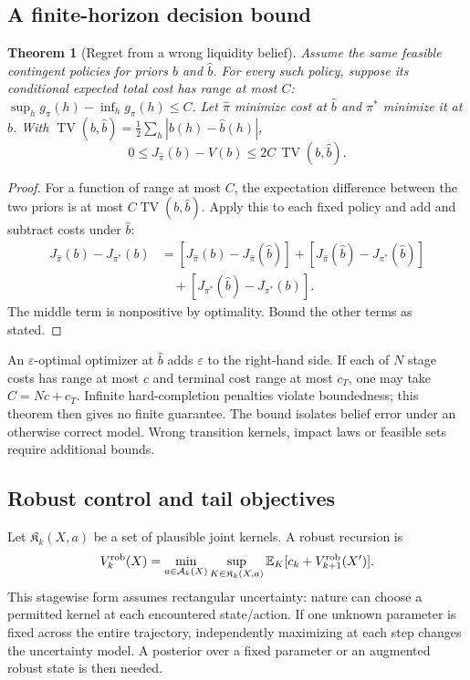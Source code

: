 \documentclass[11pt]{article}
\numberwithin{equation}{section}
\newtheorem{theorem}{Theorem}[section]
\theoremstyle{definition}
\theoremstyle{remark}
\newcommand{\E}{\mathbb{E}}
\theoremstyle{definition}
\newcommand{\A}{\mathcal A}
\newcommand{\TV}{\operatorname{TV}}
\begin{document}
\subsection{A finite-horizon decision bound}

\begin{theorem}[Regret from a wrong liquidity belief]\label{thm:belief}
Assume the same feasible contingent policies for priors $b$ and $\widehat b$.
For every such policy, suppose its conditional expected total cost has range
at most $C$: $\sup_hg_\pi(h)-\inf_hg_\pi(h)\leq C$.
Let $\widehat\pi$ minimize cost at $\widehat b$ and $\pi^*$ minimize it at $b$.
With $\TV(b,\widehat b)=\tfrac12\sum_h|b(h)-\widehat b(h)|$,
\begin{equation}\label{eq:beliefbound}
 0\leq J_{\widehat\pi}(b)-V(b)\leq 2C\,\TV(b,\widehat b).
\end{equation}
\end{theorem}
\begin{proof}
For a function of range at most $C$, the expectation difference between the
two priors is at most $C\TV(b,\widehat b)$. Apply this to each fixed policy
and add and subtract costs under $\widehat b$:
\begin{align*}
 J_{\widehat\pi}(b)-J_{\pi^*}(b)
 &= [J_{\widehat\pi}(b)-J_{\widehat\pi}(\widehat b)]
   +[J_{\widehat\pi}(\widehat b)-J_{\pi^*}(\widehat b)]\\
 &\quad+[J_{\pi^*}(\widehat b)-J_{\pi^*}(b)].
\end{align*}
The middle term is nonpositive by optimality. Bound the other terms as stated.
\end{proof}

An $\varepsilon$-optimal optimizer at $\widehat b$ adds $\varepsilon$ to the
right-hand side. If each of $N$ stage costs has range at most $c$ and terminal
cost range at most $c_T$, one may take $C=Nc+c_T$. Infinite hard-completion
penalties violate boundedness; this theorem then gives no finite guarantee.
The bound isolates belief error under an otherwise correct model. Wrong
transition kernels, impact laws or feasible sets require additional bounds.

\subsection{Robust control and tail objectives}

Let $\mathfrak K_k(X,a)$ be a set of plausible joint kernels. A robust recursion
is
\begin{equation}\label{eq:robust}
 V_k^{\rm rob}(X)=\min_{a\in\A_k(X)}\sup_{K\in\mathfrak K_k(X,a)}
                \E_K[c_k+V_{k+1}^{\rm rob}(X')].
\end{equation}
This stagewise form assumes rectangular uncertainty: nature can choose a
permitted kernel at each encountered state/action. If one unknown parameter
is fixed across the entire trajectory, independently maximizing at each step
changes the uncertainty model. A posterior over a fixed parameter or an
augmented robust state is then needed.
\end{document}
